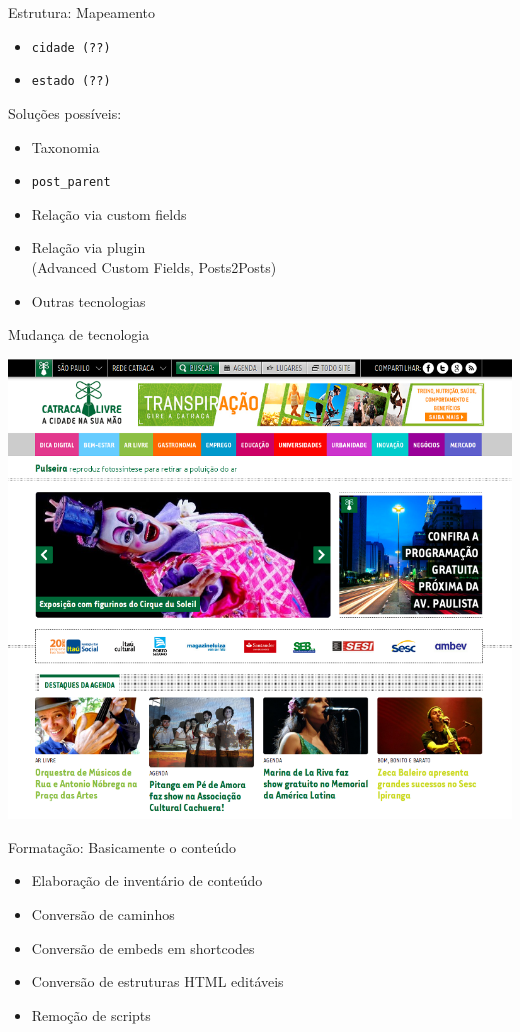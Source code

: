 \documentclass[handout]{beamer}
\begin{document}
\begin{frame}{Estrutura: Mapeamento}
  \begin{itemize}
    \item \texttt{cidade (??)}
    \item \texttt{estado (??)}
  \end{itemize}
  \pause Soluções possíveis:
  \begin{itemize}
    \item Taxonomia
    \item \texttt{post\_parent}
    \item Relação via custom fields
    \item Relação via plugin \\
          (Advanced Custom Fields, Posts2Posts)
    \item Outras tecnologias
  \end{itemize}
\end{frame}

\begin{frame}{Mudança de tecnologia}
  \begin{center}
    \pause \includegraphics[height=0.8\textheight,natwidth=800,natheight=731]{./img/catracalivre.png}
  \end{center}
\end{frame}

\begin{frame}{Formatação: Basicamente o conteúdo}
  \begin{itemize}
    \item Elaboração de inventário de conteúdo
    \item Conversão de caminhos
    \item Conversão de embeds em shortcodes
    \item Conversão de estruturas HTML editáveis
    \item Remoção de scripts
  \end{itemize}
\end{frame}
\end{document}
